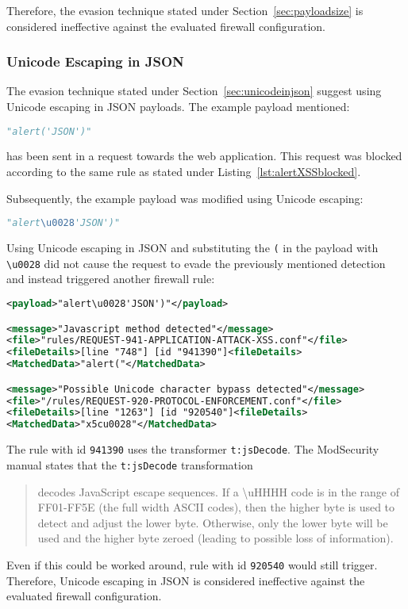 Therefore, the evasion technique stated under Section~\ref{sec:payloadsize} is considered ineffective against the evaluated firewall configuration.


\subsubsection{Unicode Escaping in JSON}
\label{sec:unicodeinjsontest}
The evasion technique stated under Section~\ref{sec:unicodeinjson} suggest using Unicode escaping in JSON payloads. The example payload mentioned:

\begin{lstlisting}[style=basicStyle, language=Python]
"alert('JSON')"
\end{lstlisting}
has been sent in a request towards the web application. This request was blocked according to the same rule as stated under Listing~\ref{lst:alertXSSblocked}.

Subsequently, the example payload was modified using Unicode escaping:

\begin{lstlisting}[style=basicStyle, language=Python]
"alert\u0028'JSON')"
\end{lstlisting}
Using Unicode escaping in JSON and substituting the \verb|(| in the payload with \verb|\u0028| did not cause the request to evade the previously mentioned detection and instead triggered another firewall rule: 

\begin{lstlisting}[style=ruleStyle, language=XML, caption=Unicode escaping blocked, label={lst:jsonunicodeescblocked}]
<payload>"alert\u0028'JSON')"</payload>

<message>"Javascript method detected"</message>
<file>"rules/REQUEST-941-APPLICATION-ATTACK-XSS.conf"</file>
<fileDetails>[line "748"] [id "941390"]<fileDetails>
<MatchedData>"alert("</MatchedData>

<message>"Possible Unicode character bypass detected"</message>
<file>"/rules/REQUEST-920-PROTOCOL-ENFORCEMENT.conf"</file>
<fileDetails>[line "1263"] [id "920540"]<fileDetails>
<MatchedData>"x5cu0028"</MatchedData>
\end{lstlisting}
The rule with id \verb|941390| uses the transformer \verb|t:jsDecode|. 
The ModSecurity manual states that the \verb|t:jsDecode| transformation

\begin{quote}
	decodes JavaScript escape sequences. If a \textbackslash uHHHH code is in the range of FF01-FF5E (the full width ASCII codes), then the higher byte is used to detect and adjust the lower byte. Otherwise, only the lower byte will be used and the higher byte zeroed (leading to possible loss of information). \cite{modsec/transjsdecode}
\end{quote}
Even if this could be worked around, rule with id \verb|920540| would still trigger.
Therefore, Unicode escaping in JSON is considered ineffective against the evaluated firewall configuration.

